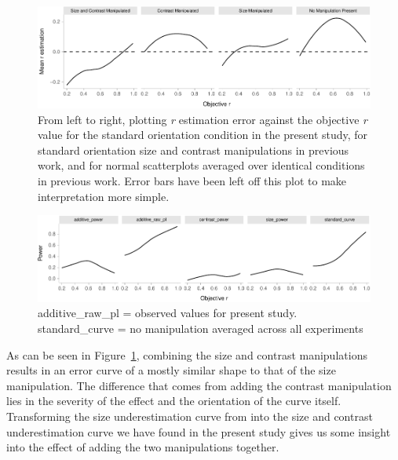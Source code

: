 \documentclass[manuscript, review, anonymous, screen]{acmart}
\begin{document}
\begin{figure}

{\centering \includegraphics[width=1\textwidth,height=\textheight]{size_and_contrast_new_files/figure-pdf/fig-error-bars-all-exp-1.pdf}

}

\caption{\label{fig-error-bars-all-exp}From left to right, plotting
\emph{r} estimation error against the objective \emph{r} value for the
standard orientation condition in the present study, for standard
orientation size and contrast manipulations in previous work, and for
normal scatterplots averaged over identical conditions in previous work.
Error bars have been left off this plot to make interpretation more
simple.}

\end{figure}

\begin{figure}

{\centering \includegraphics[width=1\textwidth,height=\textheight]{size_and_contrast_new_files/figure-pdf/fig-power-plot-1.pdf}

}

\caption{\label{fig-power-plot}additive\_raw\_pl = observed values for
present study. standard\_curve = no manipulation averaged across all
experiments}

\end{figure}

As can be seen in Figure~\ref{fig-error-bars-all-exp}, combining the
size and contrast manipulations results in an error curve of a mostly
similar shape to that of the size manipulation. The difference that
comes from adding the contrast manipulation lies in the severity of the
effect and the orientation of the curve itself. Transforming the size
underestimation curve from \citet{strain_2023} into the size and
contrast underestimation curve we have found in the present study gives
us some insight into the effect of adding the two manipulations
together.
\end{document}
